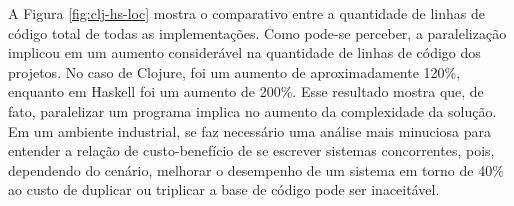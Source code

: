 A Figura \ref{fig:clj-hs-loc} mostra o comparativo entre a quantidade de linhas de código total de todas as implementações. Como pode-se perceber, a paralelização implicou em um aumento considerável na quantidade de linhas de código dos projetos. No caso de Clojure, foi um aumento de aproximadamente 120\%, enquanto em Haskell foi um aumento de 200\%. Esse resultado mostra que, de fato, paralelizar um programa implica no aumento da complexidade da solução. Em um ambiente industrial, se faz necessário uma análise mais minuciosa para entender a relação de custo-benefício de se escrever sistemas concorrentes, pois, dependendo do cenário, melhorar o desempenho de um sistema em torno de 40\% ao custo de duplicar ou triplicar a base de código pode ser inaceitável.